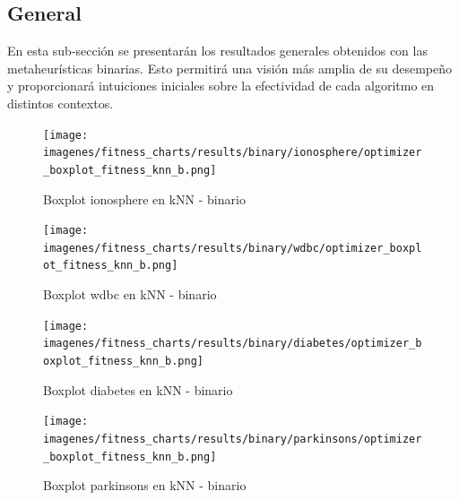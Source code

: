 \subsection{General}
En esta sub-sección se presentarán los resultados generales obtenidos con las metaheurísticas binarias. Esto permitirá una visión más amplia de su desempeño y proporcionará intuiciones iniciales sobre la efectividad de cada algoritmo en distintos contextos.

\begin{figure}[htb]
    \centering
    \texttt{[image: imagenes/fitness\_charts/results/binary/ionosphere/optimizer\_boxplot\_fitness\_knn\_b.png]}
    \caption{Boxplot ionosphere en kNN - binario}
    \label{fig:boxplot_ionosphere}
\end{figure}

\begin{figure}[htb]
    \centering
    \texttt{[image: imagenes/fitness\_charts/results/binary/wdbc/optimizer\_boxplot\_fitness\_knn\_b.png]}
    \caption{Boxplot wdbc en kNN - binario}
    \label{fig:boxplot_wdbc}
\end{figure}

\begin{figure}[htb]
    \centering
    \texttt{[image: imagenes/fitness\_charts/results/binary/diabetes/optimizer\_boxplot\_fitness\_knn\_b.png]}
    \caption{Boxplot diabetes en kNN - binario}
    \label{fig:boxplot_diabetes}
\end{figure}

\begin{figure}[htb]
    \centering
    \texttt{[image: imagenes/fitness\_charts/results/binary/parkinsons/optimizer\_boxplot\_fitness\_knn\_b.png]}
    \caption{Boxplot parkinsons en kNN - binario}
    \label{fig:boxplot_parkinsons}
\end{figure}

